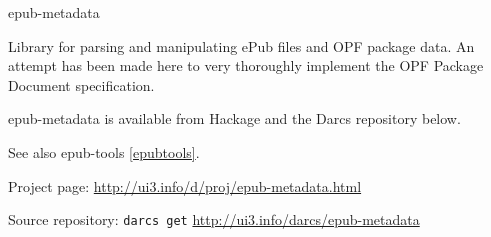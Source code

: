 \begin{hcarentry}{epub-metadata}
\makeheader

Library for parsing and manipulating ePub files and OPF package data. An attempt has been made here to very thoroughly implement the OPF Package Document specification.

epub-metadata is available from Hackage and the Darcs repository below.

See also epub-tools \cref{epubtools}.

\FurtherReading
\begin{compactitem}
\item Project page:
\url{http://ui3.info/d/proj/epub-metadata.html}

\item Source repository:
\texttt{darcs get} \url{http://ui3.info/darcs/epub-metadata}
\end{compactitem}
\end{hcarentry}
